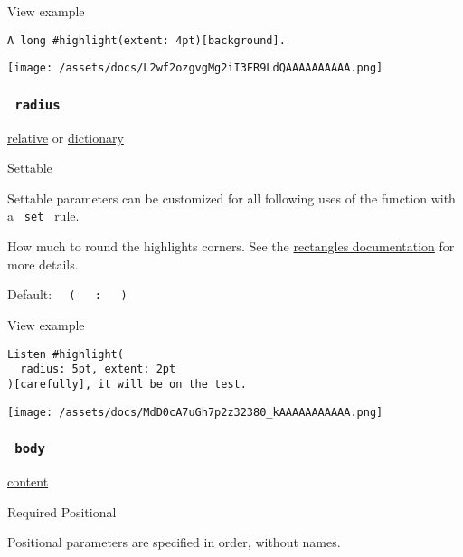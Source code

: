 
View example

\begin{verbatim}
A long #highlight(extent: 4pt)[background].
\end{verbatim}

\texttt{[image: /assets/docs/L2wf2ozgvgMg2iI3FR9LdQAAAAAAAAAA.png]}

\subsubsection{\texorpdfstring{\texttt{\ radius\ }}{ radius }}\label{parameters-radius}

\href{/docs/reference/layout/relative/}{relative} {or}
\href{/docs/reference/foundations/dictionary/}{dictionary}

{{ Settable }}

\label{parameters-radius-settable-tooltip}
Settable parameters can be customized for all following uses of the
function with a \texttt{\ set\ } rule.

How much to round the highlight\textquotesingle s corners. See the
\href{/docs/reference/visualize/rect/\#parameters-radius}{rectangle\textquotesingle s
documentation} for more details.

Default:
\texttt{\ }{\texttt{\ (\ }}\texttt{\ }{\texttt{\ :\ }}\texttt{\ }{\texttt{\ )\ }}\texttt{\ }


View example

\begin{verbatim}
Listen #highlight(
  radius: 5pt, extent: 2pt
)[carefully], it will be on the test.
\end{verbatim}

\texttt{[image: /assets/docs/MdD0cA7uGh7p2z32380\_kAAAAAAAAAAA.png]}

\subsubsection{\texorpdfstring{\texttt{\ body\ }}{ body }}\label{parameters-body}

\href{/docs/reference/foundations/content/}{content}

{Required} {{ Positional }}

\label{parameters-body-positional-tooltip}
Positional parameters are specified in order, without names.

